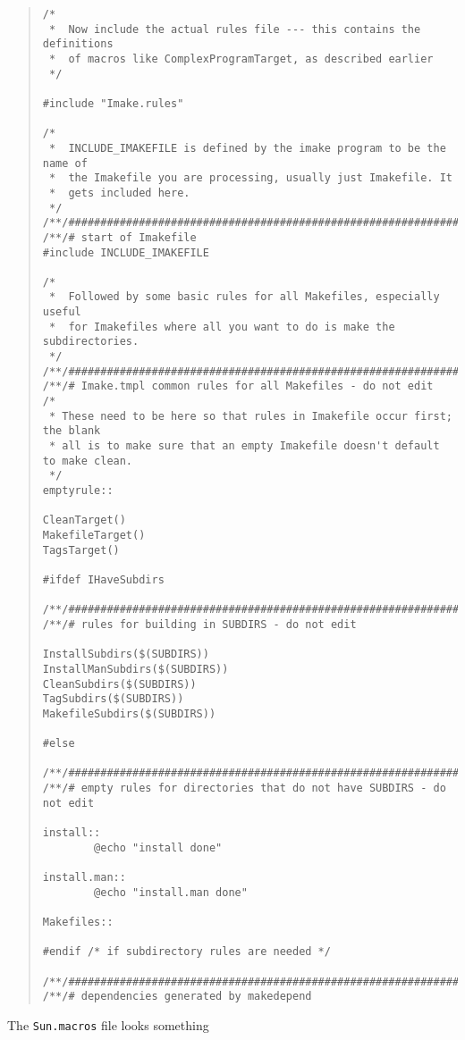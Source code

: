 \begin{quote}
\begin{verbatim}
/*
 *  Now include the actual rules file --- this contains the definitions
 *  of macros like ComplexProgramTarget, as described earlier
 */

#include "Imake.rules"

/*
 *  INCLUDE_IMAKEFILE is defined by the imake program to be the name of
 *  the Imakefile you are processing, usually just Imakefile. It
 *  gets included here.
 */
/**/###########################################################################
/**/# start of Imakefile
#include INCLUDE_IMAKEFILE

/*
 *  Followed by some basic rules for all Makefiles, especially useful
 *  for Imakefiles where all you want to do is make the subdirectories.
 */
/**/###########################################################################
/**/# Imake.tmpl common rules for all Makefiles - do not edit
/*
 * These need to be here so that rules in Imakefile occur first;  the blank
 * all is to make sure that an empty Imakefile doesn't default to make clean.
 */
emptyrule::

CleanTarget()
MakefileTarget()
TagsTarget()

#ifdef IHaveSubdirs

/**/###########################################################################
/**/# rules for building in SUBDIRS - do not edit

InstallSubdirs($(SUBDIRS))
InstallManSubdirs($(SUBDIRS))
CleanSubdirs($(SUBDIRS))
TagSubdirs($(SUBDIRS))
MakefileSubdirs($(SUBDIRS))

#else

/**/###########################################################################
/**/# empty rules for directories that do not have SUBDIRS - do not edit

install::
        @echo "install done"

install.man::
        @echo "install.man done"

Makefiles::

#endif /* if subdirectory rules are needed */

/**/###########################################################################
/**/# dependencies generated by makedepend
\end{verbatim}
\end{quote}

The {\tt Sun.macros} file looks something

